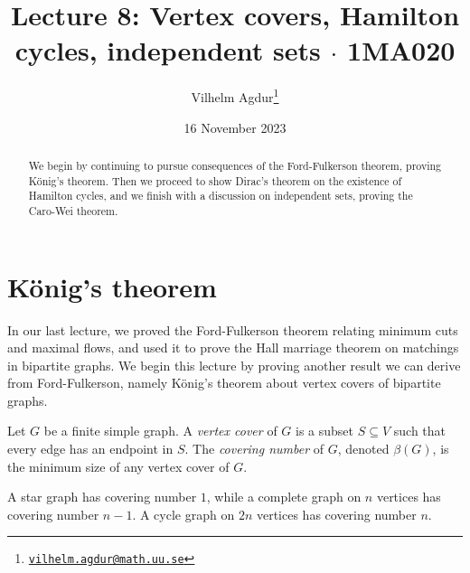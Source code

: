 \documentclass[nobib]{tufte-handout}
\title{Lecture 8: Vertex covers, Hamilton cycles, independent sets $\cdot$ 1MA020}
\author[Vilhelm Agdur]{Vilhelm Agdur\thanks{\href{mailto:vilhelm.agdur@math.uu.se}{\nolinkurl{vilhelm.agdur@math.uu.se}}}}
\date{16 November 2023}
\begin{document}
\maketitle%

\begin{abstract}
\noindent
We begin by continuing to pursue consequences of the Ford-Fulkerson theorem, proving König's theorem. Then we proceed to show Dirac's theorem on the existence of Hamilton cycles, and we finish with a discussion on independent sets, proving the Caro-Wei theorem.
\end{abstract}

\section{König's theorem}

In our last lecture, we proved the Ford-Fulkerson theorem relating minimum cuts and maximal flows, and used it to prove the Hall marriage theorem on matchings in bipartite graphs. We begin this lecture by proving another result we can derive from Ford-Fulkerson, namely König's theorem about vertex covers of bipartite graphs.

\begin{definition}
    Let $G$ be a finite simple graph. A \emph{vertex cover} of $G$ is a subset $S\subseteq V$ such that every edge has an endpoint in $S$. The \emph{covering number} of $G$, denoted $\beta(G)$, is the minimum size of any vertex cover of $G$.
\end{definition}

\begin{example}
    A star graph has covering number $1$, while a complete graph on $n$ vertices has covering number $n-1$. A cycle graph on $2n$ vertices has covering number $n$.
\end{example}
\end{document}
